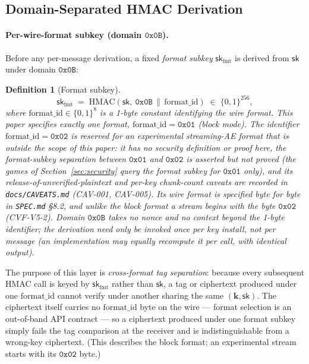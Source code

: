 \documentclass[11pt,a4paper]{article}
\newtheorem{definition}[theorem]{Definition}
\begin{document}
\subsection{Domain-Separated HMAC Derivation}
\label{sec:domains}

\paragraph{Per-wire-format subkey (domain $\texttt{0x0B}$).}
Before any per-message derivation, a fixed \emph{format subkey}
$\mathsf{sk}_{\mathrm{fmt}}$ is derived from $\mathsf{sk}$ under domain
$\texttt{0x0B}$:
\begin{definition}[Format subkey]\label{def:fmtkey}
\[
  \mathsf{sk}_{\mathrm{fmt}}
    \;=\;
  \mathrm{HMAC}\!\left(\mathsf{sk},\ \texttt{0x0B}\,\|\,\mathrm{format\_id}\right)
    \;\in\;\{0,1\}^{256},
\]
where $\mathrm{format\_id}\in\{0,1\}^{8}$ is a 1-byte constant
identifying the wire format. This paper specifies exactly one format,
$\mathrm{format\_id}=\texttt{0x01}$ (block mode). The identifier
$\mathrm{format\_id}=\texttt{0x02}$ is reserved for an experimental
streaming-AE format that is outside the scope of this paper: it has no
security definition or proof here, the format-subkey separation between
$\texttt{0x01}$ and $\texttt{0x02}$ is asserted but not proved (the games
of Section~\ref{sec:security} query the format subkey for $\texttt{0x01}$
only), and its release-of-unverified-plaintext and per-key chunk-count
caveats are recorded in \texttt{docs/CAVEATS.md} (CAV-001, CAV-005). Its
wire format is specified byte for byte in \texttt{SPEC.md} \S 8.2, and
unlike the block format a stream begins with the byte $\texttt{0x02}$
(CVF-V5-2). Domain $\texttt{0x0B}$ takes no nonce and
no context beyond the 1-byte identifier; the derivation need only be
invoked once per key install, not per message (an implementation may
equally recompute it per call, with identical output).
\end{definition}
The purpose of this layer is \emph{cross-format tag separation}: because
every subsequent HMAC call is keyed by $\mathsf{sk}_{\mathrm{fmt}}$
rather than $\mathsf{sk}$, a tag or ciphertext produced under one
$\mathrm{format\_id}$ cannot verify under another sharing the same
$(\mathbf{k},\mathsf{sk})$. The ciphertext itself carries no
$\mathrm{format\_id}$ byte on the wire — format selection is an
out-of-band API contract — so a ciphertext produced under one format
subkey simply fails the tag comparison at the receiver and is
indistinguishable from a wrong-key ciphertext. (This describes the block
format; an experimental stream starts with its $\texttt{0x02}$ byte.)
\end{document}
